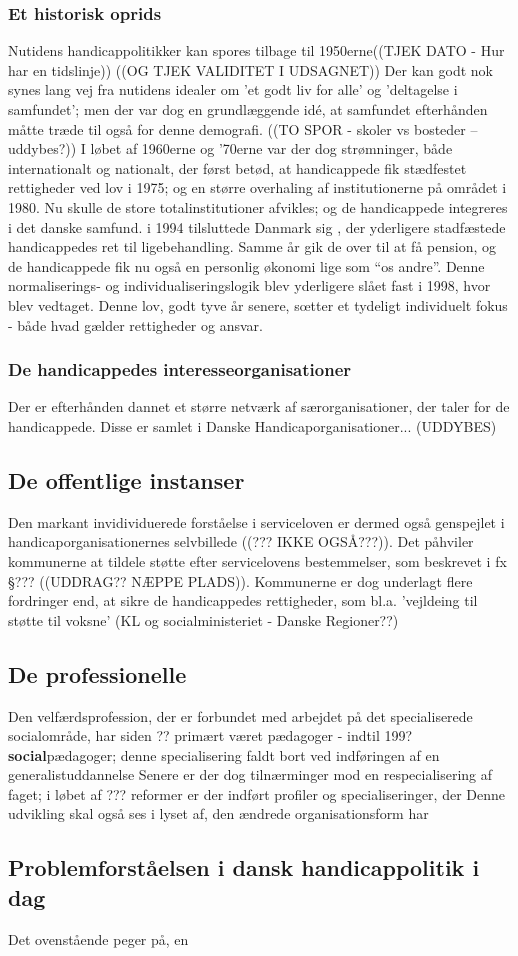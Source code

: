 \subsubsection{Et historisk oprids}
Nutidens handicappolitikker kan spores tilbage til 1950erne((TJEK DATO - Hur har en tidslinje)) ((OG TJEK VALIDITET I UDSAGNET))
Der kan godt nok synes lang vej fra nutidens idealer om 'et godt liv for alle' og 'deltagelse i samfundet'; men der var dog en grundlæggende idé, at samfundet efterhånden måtte træde til også for denne demografi.
((TO SPOR - skoler vs bosteder -- uddybes?))
I løbet af 1960erne og '70erne var der dog strømninger, både internationalt og nationalt, der først betød, at handicappede fik stædfestet rettigheder ved lov i 1975; og en større overhaling af institutionerne på området i 1980.
Nu skulle de store totalinstitutioner afvikles; og de handicappede integreres i det danske samfund. 
i 1994 tilsluttede Danmark sig , der yderligere stadfæstede handicappedes ret til ligebehandling. Samme år gik de over til at få pension, og de handicappede fik nu også en personlig økonomi lige som “os andre”.
Denne normaliserings- og individualiseringslogik blev yderligere slået fast i 1998, hvor  blev vedtaget.
Denne lov, godt tyve år senere, sœtter et tydeligt individuelt fokus - både hvad gælder rettigheder og ansvar.

\subsubsection{De handicappedes interesseorganisationer}
Der er efterhånden dannet et større netværk af særorganisationer, der taler for de handicappede.
Disse er samlet i Danske Handicaporganisationer... (UDDYBES)

\subsection{De offentlige instanser}
Den markant invidividuerede forståelse i serviceloven er dermed også genspejlet i handicaporganisationernes selvbillede ((??? IKKE OGSÅ???)).
Det påhviler kommunerne at tildele støtte efter servicelovens bestemmelser, som beskrevet i fx §??? ((UDDRAG?? NÆPPE PLADS)).
Kommunerne er dog underlagt flere fordringer end, at sikre de handicappedes rettigheder, som bl.a. 'vejldeing til støtte til voksne' (KL og socialministeriet - Danske Regioner??)

\subsection{De professionelle}
Den velfærdsprofession, der er forbundet med arbejdet på det specialiserede socialområde, har siden ?? primært været pædagoger - indtil 199? \textbf{social}pædagoger; denne specialisering faldt bort ved indføringen af en generalistuddannelse
Senere er der dog tilnærminger mod en respecialisering af faget; i løbet af ??? reformer er der indført profiler og specialiseringer, der 
Denne udvikling skal også ses i lyset af, den ændrede organisationsform har 

\subsection{Problemforståelsen i dansk handicappolitik i dag}
Det ovenstående peger på, en

